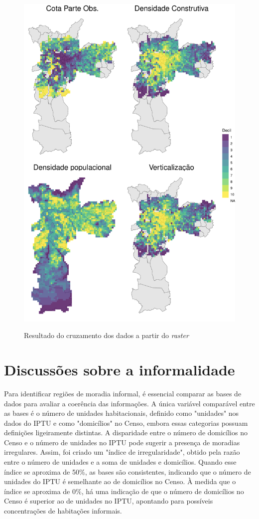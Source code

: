 \begin{apendicesenv}
\begin{figure}[h]
    \centering
    \caption{Resultado do cruzamento dos dados a partir do \textit{raster}}
    \includegraphics[width = .75\linewidth]{figuras/rasters.pdf}
    \label{fig:rasters}
\end{figure}


\chapter{Discussões sobre a informalidade}
\label{appendix:informalidade}

Para identificar regiões de moradia informal, é essencial comparar as bases de dados para avaliar a coerência das informações. A única variável comparável entre as bases é o número de unidades habitacionais, definido como "unidades" nos dados do IPTU e como "domicílios" no Censo, embora essas categorias possuam definições ligeiramente distintas. A disparidade entre o número de domicílios no Censo e o número de unidades no IPTU pode sugerir a presença de moradias irregulares. Assim, foi criado um "índice de irregularidade", obtido pela razão entre o número de unidades e a soma de unidades e domicílios. Quando esse índice se aproxima de 50\%, as bases são consistentes, indicando que o número de unidades do IPTU é semelhante ao de domicílios no Censo. À medida que o índice se aproxima de 0\%, há uma indicação de que o número de domicílios no Censo é superior ao de unidades no IPTU, apontando para possíveis concentrações de habitações informais.


\end{apendicesenv}

